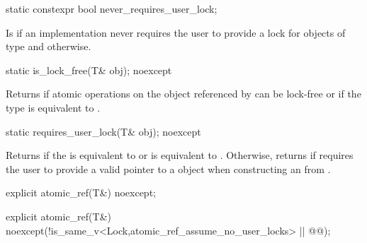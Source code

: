\begin{addedblock}
\begin{itemdecl}
static constexpr bool never_requires_user_lock;
\end{itemdecl}

\begin{itemdescr}
\pnum
Is  if an implementation never requires the user to provide a 
lock for objects of type  and  otherwise.
\end{itemdescr}

\begin{itemdecl}
static is_lock_free(T& obj); noexcept
\end{itemdecl}

\begin{itemdescr}
\returns Returns  if atomic operations on the object referenced by
 can be lock-free or if the  type is equivalent to 
.
\end{itemdescr}

\begin{itemdecl}
static requires_user_lock(T& obj); noexcept
\end{itemdecl}

\begin{itemdescr}
\returns Returns  if the  is equivalent to 
or  is equivalent to .
Otherwise, returns  if  requires the user to
provide a valid pointer to a  object when constructing an 
 from . 
\end{itemdescr}
\end{addedblock}

\begin{itemdecl}
\begin{removedblock}
explicit atomic_ref(T&) noexcept;
\end{removedblock}
\begin{addblock}
explicit atomic_ref(T&) noexcept(!is_same_v<Lock,atomic_ref_assume_no_user_locks>
  || @@);
\end{addblock}
\end{itemdecl}


